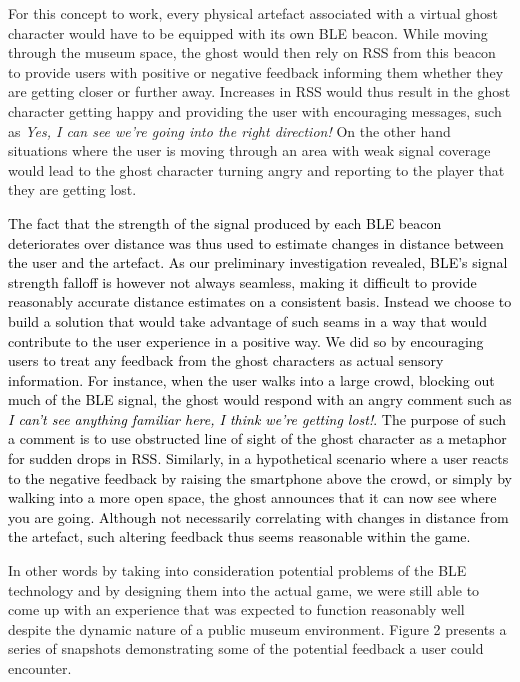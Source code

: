 \documentclass[prodmode,acmtomm]{acmsmall}
\begin{document}
For this concept to work, every physical artefact associated with a virtual ghost character would have to be equipped with its own BLE beacon. While moving through the museum space, the ghost would then rely on RSS from this beacon to provide users with positive or negative feedback informing them whether they are getting closer or further away. Increases in RSS would thus result in the ghost character getting happy and providing the user with encouraging messages, such as \textit{Yes, I can see we're going into the right direction!} On the other hand situations where the user is moving through an area with weak signal coverage would lead to the ghost character turning angry and reporting to the player that they are getting lost. 

\textcolor{black}{The fact that the strength of the signal produced by each BLE beacon deteriorates over distance was thus used to estimate changes in distance between the user and the artefact. As our preliminary investigation revealed, BLE's signal strength falloff is however not always seamless, making it difficult to provide reasonably accurate distance estimates on a consistent basis. Instead we choose to build a solution that would take advantage of such seams in a way that would contribute to the user experience in a positive way. We did so by encouraging users to treat any feedback from the ghost characters as actual sensory information. For instance, when the user walks into a large crowd, blocking out much of the BLE signal, the ghost would respond with an angry comment such as \textit{I can’t see anything familiar here, I think we’re getting lost!}. The purpose of such a comment is to use obstructed line of sight of the ghost character as a metaphor for sudden drops in RSS. Similarly, in a hypothetical scenario where a user reacts to the negative feedback by raising the smartphone above the crowd, or simply by walking into a more open space, the ghost announces that it can now see where you are going. Although not necessarily correlating with changes in distance from the artefact, such altering feedback thus seems reasonable within the game.} 

In other words by taking into consideration potential problems of the BLE technology and by designing them into the actual game, we were still able to come up with an experience that was expected to function reasonably well despite the dynamic nature of a public museum environment. Figure 2 presents a series of snapshots demonstrating some of the potential feedback a user could encounter. 
\end{document}
